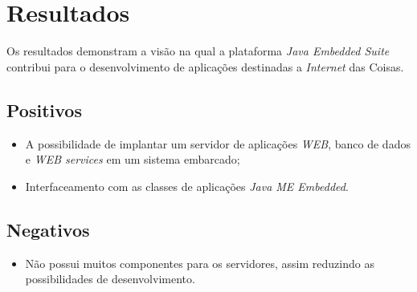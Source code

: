 \section{Resultados}

Os resultados demonstram a visão na qual a plataforma \textit{Java Embedded 
Suite} contribui para o desenvolvimento de aplicações destinadas a 
\textit{Internet} das Coisas.

\subsection{Positivos}

\begin{itemize}
    
    \item A possibilidade de implantar um servidor de aplicações \textit{WEB}, 
    banco de dados e \textit{WEB services} em um sistema embarcado;
    
    \item Interfaceamento com as classes de aplicações \textit{Java ME 
    Embedded}.

\end{itemize}

\subsection{Negativos}

\begin{itemize}
    
    \item Não possui muitos componentes para os servidores, assim reduzindo as 
    possibilidades de desenvolvimento.
    
\end{itemize}

